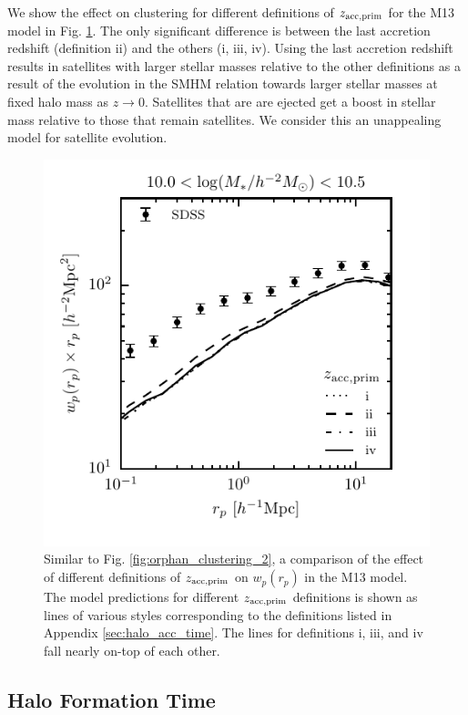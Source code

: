 \documentclass[a4paper,fleqn,usenatbib]{mnras}
\begin{document}
We show the effect on clustering for different definitions of $z_{\rm acc, prim}$ for the M13 model in Fig. \ref{fig:zacc_wp_comp}.  The only significant difference is between the last accretion redshift (definition ii) and the others (i, iii, iv).  Using the last accretion redshift results in satellites with larger stellar masses relative to the other definitions as a result of the evolution in the SMHM relation towards larger stellar masses at fixed halo mass as $z \rightarrow 0$.  Satellites that are are ejected get a boost in stellar mass relative to those that remain satellites.  We consider this an unappealing model for satellite evolution.
          
%
\begin{figure}
\includegraphics[]{figures/wp_comparison_zacc_prime_2.pdf}
\caption{Similar to Fig. \ref{fig:orphan_clustering_2}, a comparison of the effect of different definitions of $z_{\rm acc, prim}$ on $w_p(r_p)$ in the M13 model.  The model predictions for different $z_{\rm acc, prim}$ definitions is shown as lines of various styles corresponding to the definitions listed in Appendix \ref{sec:halo_acc_time}.  The lines for definitions i, iii, and iv fall nearly on-top of each other.}
\label{fig:zacc_wp_comp}
\end{figure}
%

\subsection{Halo Formation Time}
\end{document}
